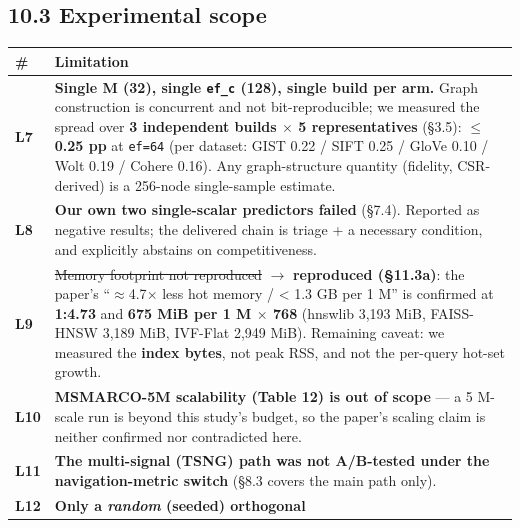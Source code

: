 \documentclass[
  10pt,
]{article}
\newcounter{none} %
\begin{document}
\subsection{10.3 Experimental scope}\label{experimental-scope}

{\def\LTcaptype{none} %
\begin{longtable}[]{@{}
  >{\raggedright\arraybackslash}p{}
  >{\raggedright\arraybackslash}p{}@{}}
\toprule\noalign{}
\begin{minipage}[b]{\linewidth}\raggedright
\#
\end{minipage} & \begin{minipage}[b]{\linewidth}\raggedright
Limitation
\end{minipage} \\
\midrule\noalign{}
\endhead
\bottomrule\noalign{}
\endlastfoot
\textbf{L7} & \textbf{Single M (32), single \texttt{ef\_c} (128), single
build per arm.} Graph construction is concurrent and not
bit-reproducible; we measured the spread over \textbf{3 independent
builds $\times$ 5 representatives} (§3.5): \textbf{$\leq$ 0.25 pp} at \texttt{ef=64}
(per dataset: GIST 0.22 / SIFT 0.25 / GloVe 0.10 / Wolt 0.19 / Cohere
0.16). Any graph-structure quantity (fidelity, CSR-derived) is a
256-node single-sample estimate. \\
\textbf{L8} & \textbf{Our own two single-scalar predictors failed}
(§7.4). Reported as negative results; the delivered chain is triage + a
necessary condition, and explicitly abstains on competitiveness. \\
\textbf{L9} & \st{Memory footprint not reproduced} $\rightarrow$ \textbf{reproduced
(§11.3a)}: the paper's ``$\approx$4.7$\times$ less hot memory / \textless{} 1.3 GB per
1 M'' is confirmed at \textbf{1:4.73} and \textbf{675 MiB per 1 M $\times$ 768}
(hnswlib 3,193 MiB, FAISS-HNSW 3,189 MiB, IVF-Flat 2,949 MiB). Remaining
caveat: we measured the \textbf{index bytes}, not peak RSS, and not the
per-query hot-set growth. \\
\textbf{L10} & \textbf{MSMARCO-5M scalability (Table 12) is out of
scope} --- a 5 M-scale run is beyond this study's budget, so the paper's
scaling claim is neither confirmed nor contradicted here. \\
\textbf{L11} & \textbf{The multi-signal (TSNG) path was not A/B-tested
under the navigation-metric switch} (§8.3 covers the main path only). \\
\textbf{L12} & \textbf{Only a \emph{random} (seeded) orthogonal
}
\end{longtable}}
\end{document}
